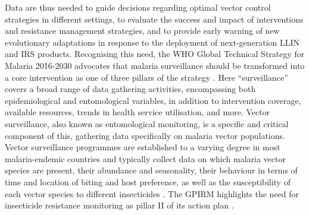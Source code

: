 \documentclass[a4paper,11pt,abstracton,hidelinks]{scrartcl}
\begin{document}
Data are thus needed to guide decisions regarding optimal vector control strategies in different settings, to evaluate the success and impact of interventions and resistance management strategies, and to provide early warning of new evolutionary adaptations in response to the deployment of next-generation LLIN and IRS products.
%
Recognising this need, the WHO Global Technical Strategy for Malaria 2016-2030 advocates that malaria surveillance should be transformed into a core intervention as one of three pillars of the strategy \citep{WHO2015GTS}.
%
Here ``surveillance'' covers a broad range of data gathering activities, encompassing both epidemiological and entomological variables, in addition to intervention coverage, available resources, trends in health service utilisation, and more. 
%
Vector surveillance, also known as entomological monitoring, is a specific and critical component of this, gathering data specifically on malaria vector populations.
%
Vector surveillance programmes are established to a varying degree in most malaria-endemic countries and typically collect data on which malaria vector species are present, their abundance and seasonality, their behaviour in terms of time and location of biting and host preference, as well as the susceptibility of each vector species to different insecticides \citep{Russell2020}.
%
The GPIRM highlights the need for insecticide resistance monitoring as pillar \RN{2} of its action plan \citep{WHO2012GPIRM}.


\printbibliography
\end{document}
